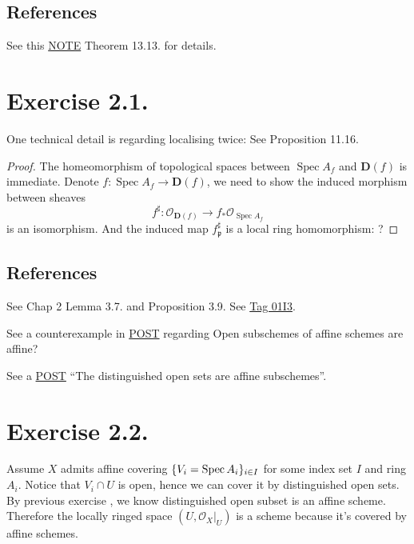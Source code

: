 \subsection{References}

See this \href{https://math.mit.edu/~mckernan/Teaching/09-10/Autumn/18.725/l_13.pdf}{NOTE} Theorem 13.13. for details.

\section{Exercise 2.1.}\label{Hart Ex 2.1.}

One technical detail is regarding localising twice: See \cite{altman2013term} Proposition 11.16.

\begin{proof}
The homeomorphism of topological spaces between $\operatorname{Spec}A_f$ and $\mathbf D(f)$ is immediate. Denote $f:\operatorname{Spec}A_f\to \mathbf D(f)$, we need to show the induced morphism between sheaves
\[f^{\sharp}:\mathcal O_{\mathbf D(f)}\to f_{\ast}\mathcal O_{\operatorname{Spec}A_f}\] is an isomorphism. And the induced map $f^{\sharp}_{\mathfrak p}$ is a local ring homomorphism: ?

\end{proof}

\subsection{References}

See \cite{qing2006algebraic} Chap 2 Lemma 3.7. and Proposition 3.9. 
See \href{https://stacks.math.columbia.edu/tag/01I3}{Tag 01I3}.

See a counterexample in \href{https://math.stackexchange.com/questions/509009/open-subschemes-of-affine-schemes-are-affine/509018#509018}{POST} regarding Open subschemes of affine schemes are affine?

See a \href{https://math.stackexchange.com/questions/408507/the-distinguished-open-sets-are-affine-subschemes}{POST} \enquote{The distinguished open sets are affine subschemes}.

\section{Exercise 2.2.}

Assume $X$ admits affine covering $\{V_i=\operatorname{Spec} A_i \}_{i\in I}$ for some index set $I$ and ring $A_i$. Notice that $V_i\cap U$ is open, hence we can cover it by distinguished open sets. By previous exercise , we know distinguished open subset is an affine scheme. Therefore the locally ringed space $(U,\mathcal O_X\vert_{U})$ is a scheme because it's covered by affine schemes. 

